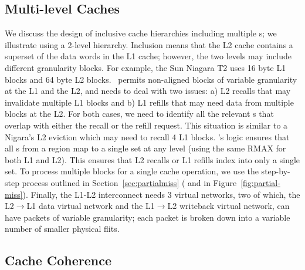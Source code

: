 \subsection{Multi-level Caches}
\label{sec:multicache}

We discuss the design of inclusive cache hierarchies including multiple \AC{}s; we illustrate using a 2-level hierarchy. Inclusion means that the L2 cache contains a superset of the data words in the L1 cache; however, the two levels may include different granularity blocks. For example, the Sun Niagara T2 uses 16 byte L1 blocks and 64 byte L2 blocks. \AC\ permits non-aligned blocks of variable granularity at the L1 and the L2, and needs to deal with two issues: a) L2 recalls that may invalidate multiple L1 blocks and b) L1 refills that may need data from multiple blocks at the L2. For both cases, we need to identify all the relevant \AB{}s that overlap with either the recall or the refill request. This situation is similar to a Nigara's L2 eviction which may need to recall 4 L1 blocks. \AC{}'s logic ensures that all \AB{}s from a region map to a single set at any level (using the same RMAX for both L1 and L2). This ensures that L2 recalls or L1 refills index into only a single set. To process multiple blocks for a single cache operation, we use the step-by-step process outlined in Section~\ref{sec:partialmiss} ( and  in Figure~\ref{fig:partial-miss}). Finally, the L1-L2 interconnect needs 3 virtual networks, two of which, the L2$\rightarrow$L1 data virtual network and the L1$\rightarrow$L2 writeback virtual network, can have packets of variable granularity; each packet is broken down into a variable number of smaller physical flits.


\subsection{Cache Coherence}
\label{sec:coherence}

